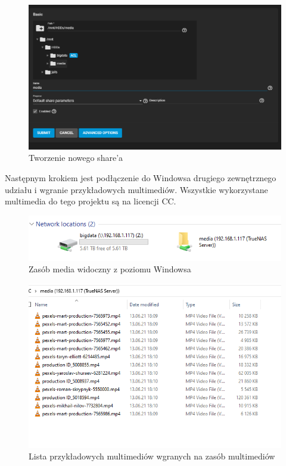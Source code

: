 \documentclass[12pt,a4paper]{article}
\newcommand{\<}{\langle}
\renewcommand{\>}{\rangle}
\theoremstyle{definition}
\begin{document}
\begin{figure}[H]
    \centering
    \includegraphics[width=\linewidth]{img/ss_plex/12.png}
    \caption{Tworzenie nowego share'a}
\end{figure}

Następnym krokiem jest podłączenie do Windowsa drugiego zewnętrznego udziału i wgranie przykładowych multimediów. Wszystkie wykorzystane multimedia do tego projektu są na licencji CC.

\begin{figure}[H]
    \centering
    \includegraphics[width=\linewidth]{img/ss_plex/13.png}
    \caption{Zasób media widoczny z poziomu Windowsa}
\end{figure}

\begin{figure}[H]
    \centering
    \includegraphics[width=\linewidth]{img/ss_plex/14.png}
    \caption{Lista przykładowych multimediów wgranych na zasób multimediów}
\end{figure}
\end{document}
